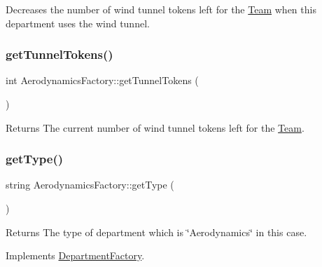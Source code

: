 Decreases the number of wind tunnel tokens left for the \hyperlink{classTeam}{Team} when this department uses the wind tunnel. \mbox{\label{classAerodynamicsFactory_a687a3fcb4eeabf97d8c024cfb63406e5}} 
\subsubsection{\texorpdfstring{get\+Tunnel\+Tokens()}{getTunnelTokens()}}
{\footnotesize\ttfamily int Aerodynamics\+Factory\+::get\+Tunnel\+Tokens (\begin{DoxyParamCaption}{ }\end{DoxyParamCaption})}

\begin{DoxyReturn}{Returns}
The current number of wind tunnel tokens left for the \hyperlink{classTeam}{Team}. 
\end{DoxyReturn}
\mbox{\label{classAerodynamicsFactory_a3b0af6c00d4a8549164b3d5ec9a1f256}} 
\subsubsection{\texorpdfstring{get\+Type()}{getType()}}
{\footnotesize\ttfamily string Aerodynamics\+Factory\+::get\+Type (\begin{DoxyParamCaption}{ }\end{DoxyParamCaption})\hspace{0.3cm}{\ttfamily [virtual]}}

\begin{DoxyReturn}{Returns}
The type of department which is \char`\"{}\+Aerodynamics\char`\"{} in this case. 
\end{DoxyReturn}


Implements \hyperlink{classDepartmentFactory_a5aac775b89c4c390ad885e1de8947b0d}{Department\+Factory}.

\mbox{\label{classAerodynamicsFactory_a873e60729f4e8a74608fbf29322cf2f6}} 
